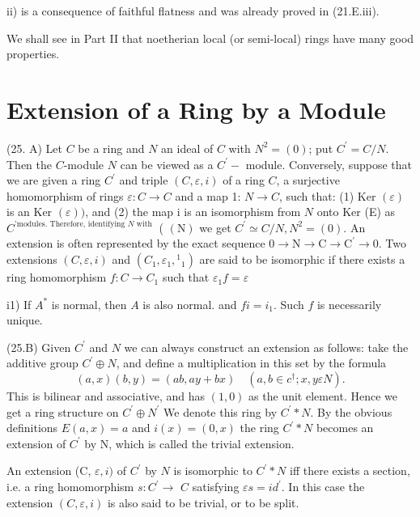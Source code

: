 ii) is a consequence of faithful flatness and was already proved in (21.E.iii).

We shall see in Part II that noetherian local (or semi-local) rings have many good properties.

\section{Extension of a Ring by a Module}
(25. A) Let $C$ be a ring and $N$ an ideal of $C$ with $N^{2}=(0)$; put $C^{\prime}=C / N$. Then the $C$-module $N$ can be viewed as a $C^{\prime}-$ module. Conversely, suppose that we are given a ring $C^{\prime}$ and triple $(C, \varepsilon, i)$ of a ring $C$, a surjective homomorphism of rings $\varepsilon: C \rightarrow C$ and a map 1: $N \rightarrow C$, such that: (1) Ker $(\varepsilon)$ is an Ker $(\varepsilon))$, and (2) the map i is an isomorphism from $N$ onto Ker (E) as $C^{\text {'modules. Therefore, identifying } N \text { with }}$ ( $(\mathrm{N})$ we get $C^{\prime} \simeq C / N, N^{2}=(0)$. An extension is often represented by the exact sequence $0 \rightarrow \mathrm{N} \rightarrow \mathrm{C} \rightarrow \mathrm{C}^{\prime} \rightarrow 0$. Two extensions $(C, \varepsilon, i)$ and $\left(C_{1}, \varepsilon_{1},{ }^{1}{ }_{1}\right)$ are said to be isomorphic if there exists a ring homomorphism $f: C \rightarrow C_{1}$ such that $\varepsilon_{1} f=\varepsilon$

i1) If $A^{*}$ is normal, then $A$ is also normal. and $f i=i_{1}$. Such $f$ is necessarily unique.

(25.B) Given $C^{\prime}$ and $N$ we can always construct an extension as follows: take the additive group $C^{\prime} \oplus N$, and define a multiplication in this set by the formula
$$
(a, x)(b, y)=(a b, a y+b x) \quad\left(a, b \in c^{\dagger} ; x, y \varepsilon N\right) .
$$
This is bilinear and associative, and has $(1,0)$ as the unit element. Hence we get a ring structure on $C^{\prime} \oplus N^{\prime}$ We denote this ring by $C^{\prime} * N$. By the obvious definitions $E(a, x)=a$ and $i(x)=(0, x)$ the ring $C^{\prime} * N$ becomes an extension of $C^{\prime}$ by $\mathrm{N}$, which is called the trivial extension.

An extension (C, $\varepsilon, i)$ of $C^{\prime}$ by $N$ is isomorphic to $C^{\prime} * N$ iff there exists a section, i.e. a ring homomorphism $s: C^{\prime} \rightarrow$ $C$ satisfying $\varepsilon s=i d^{\prime}$. In this case the extension $(C, \varepsilon, i)$ is also said to be trivial, or to be split.


